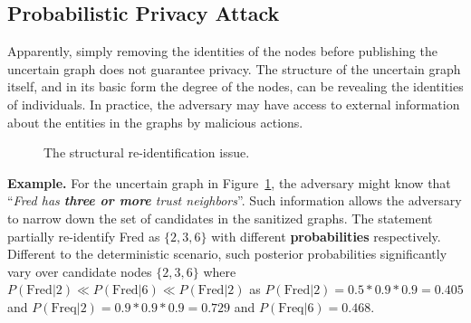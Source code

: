 \subsection{Probabilistic Privacy Attack}
\label{sec:AMPC}
Apparently, simply removing the identities of the nodes before publishing the uncertain graph does not guarantee privacy.  
The structure of the uncertain graph itself, and in its basic form the degree of the nodes, can be revealing the identities of individuals. 
In practice, the adversary may have access to external information about the entities in the graphs by malicious actions. 
\begin{figure}[!htb]
    \vspace{-2pt}
    \vspace{-4pt}
    \caption{The structural re-identification issue.}
    \label{fig:privacyAttack}
\end{figure} 
\textbf{Example.} For the uncertain graph in Figure~\ref{fig:privacyAttack}, the adversary might know that ``\emph{Fred has \textbf{three or more} trust neighbors}''. Such information allows the adversary to narrow down the set of candidates in the sanitized graphs.  The statement partially re-identify Fred as $\lbrace 2,3,6 \rbrace$ with different \textbf{probabilities} respectively. 
Different to the deterministic scenario, such posterior probabilities significantly vary over candidate nodes $\lbrace 2,3,6 \rbrace$ where $P(\text{Fred}|2) \ll P(\text{Fred}|6) \ll P(\text{Fred}|2)$ as $P(\text{Fred}|2)=0.5*0.9*0.9=0.405$ and $P(\text{Freq}|2)=0.9*0.9*0.9=0.729$ and $P(\text{Freq}|6)=0.468$. 


